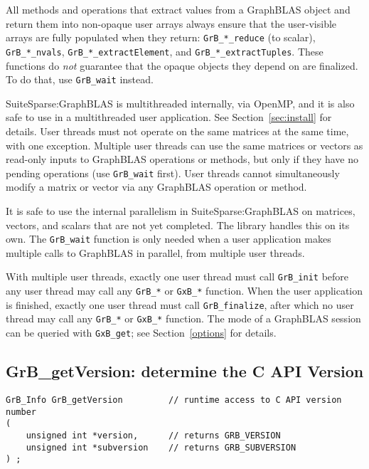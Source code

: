\documentclass[12pt]{article}
\begin{document}
All methods and operations that extract values from a GraphBLAS object and
return them into non-opaque user arrays always ensure that the user-visible
arrays are fully populated when they return: \verb'GrB_*_reduce' (to scalar),
\verb'GrB_*_nvals', \verb'GrB_*_extractElement', and
\verb'GrB_*_extractTuples'.  These functions do {\em not} guarantee that the
opaque objects they depend on are finalized.  To do that, use
\verb'GrB_wait' instead.

SuiteSparse:GraphBLAS is multithreaded internally, via OpenMP, and it is also
safe to use in a multithreaded user application.  See Section~\ref{sec:install}
for details.
User threads must not operate on the same matrices at the same time, with one
exception.  Multiple user threads can use the same matrices or vectors as
read-only inputs to GraphBLAS operations or methods, but only if they have no
pending operations (use \verb'GrB_wait'
first).  User threads cannot simultaneously modify a matrix or vector via any
GraphBLAS operation or method.

It is safe to use the internal parallelism in SuiteSparse:GraphBLAS on
matrices, vectors, and scalars that are not yet completed.  The library
handles this on its own.  The \verb'GrB_wait' function is only
needed when a user application makes multiple calls to GraphBLAS in parallel,
from multiple user threads.

With multiple user threads, exactly one user thread must call \verb'GrB_init'
before any user thread may call any \verb'GrB_*' or \verb'GxB_*' function.
When the user application is finished, exactly one user thread must call
\verb'GrB_finalize', after which no user thread may call any \verb'GrB_*' or
\verb'GxB_*' function.
The mode of a GraphBLAS session can be queried with \verb'GxB_get';
see Section~\ref{options} for details.

\subsection{{\sf GrB\_getVersion:} determine the C API Version} %
\label{getVersion}

\begin{mdframed}[userdefinedwidth=6in]
{\footnotesize
\begin{verbatim}
GrB_Info GrB_getVersion         // runtime access to C API version number
(
    unsigned int *version,      // returns GRB_VERSION
    unsigned int *subversion    // returns GRB_SUBVERSION
) ;
\end{verbatim}
}\end{mdframed}
\end{document}
